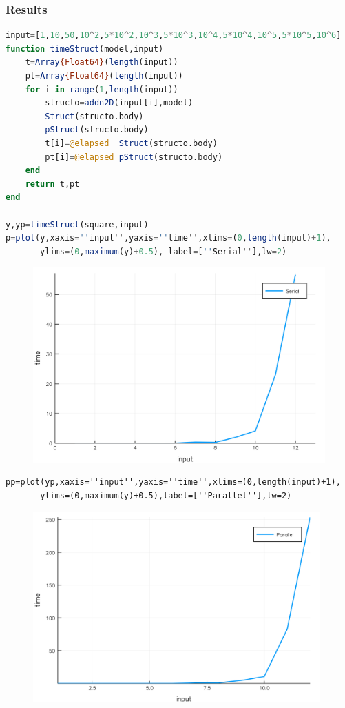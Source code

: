 \documentclass[a4paper,12pt]{article}
\begin{document}
\subsubsection{Results}
\begin{lstlisting}[language=Julia]
input=[1,10,50,10^2,5*10^2,10^3,5*10^3,10^4,5*10^4,10^5,5*10^5,10^6]
function timeStruct(model,input)
	t=Array{Float64}(length(input))
	pt=Array{Float64}(length(input))
	for i in range(1,length(input))
	    structo=addn2D(input[i],model)
	    Struct(structo.body)
	    pStruct(structo.body)
	    t[i]=@elapsed  Struct(structo.body)
	    pt[i]=@elapsed pStruct(structo.body)
	end
	return t,pt
end

y,yp=timeStruct(square,input)
p=plot(y,xaxis=''input'',yaxis=''time'',xlims=(0,length(input)+1),
       ylims=(0,maximum(y)+0.5), label=[''Serial''],lw=2)
\end{lstlisting}
\begin{figure}[ht!]
\includegraphics[width=13cm,scale=0.3]{struct.png}
\end{figure}
\newpage
\begin{verbatim}
pp=plot(yp,xaxis=''input'',yaxis=''time'',xlims=(0,length(input)+1),
       ylims=(0,maximum(y)+0.5),label=[''Parallel''],lw=2)
\end{verbatim}
\begin{figure}[ht!]
\centering
\includegraphics[width=11cm,scale=0.3]{pstruct.png}
\end{figure}
\end{document}
